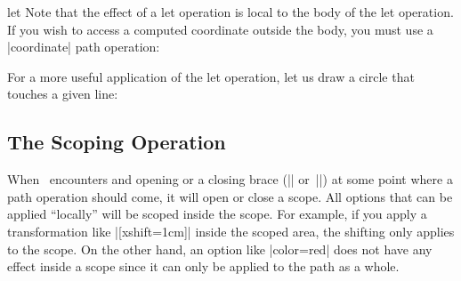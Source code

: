 \begin{pathoperation}{let}{
        }
    Note that the effect of a let operation is local to the body of the let
    operation. If you wish to access a computed coordinate outside the body,
    you must use a |coordinate| path operation:
\begin{codeexample}[preamble={\usetikzlibrary{calc}}]
\end{codeexample}

    For a more useful application of the let operation, let us draw a circle
    that touches a given line:
\begin{codeexample}[pre={\pgfmathsetseed{1}},preamble={\usetikzlibrary{calc}}]
\end{codeexample}
\end{pathoperation}


\subsection{The Scoping Operation}

When \tikzname\ encounters and opening or a closing brace (|{| or~|}|) at some
point where a path operation should come, it will open or close a scope. All
options that can be applied ``locally'' will be scoped inside the scope. For
example, if you apply a transformation like |[xshift=1cm]| inside the scoped
area, the shifting only applies to the scope. On the other hand, an option like
|color=red| does not have any effect inside a scope since it can only be
applied to the path as a whole.

